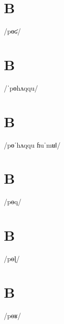 \documentclass[10pt,a4paper,twoside]{book}
\begin{document}
\section*{B}

\begin{multicols}{3}
 {/pɵʛ/} {}
\end{multicols}

\section*{B}

\begin{multicols}{3}
 {/ˈpɵhʌqqu/} {}
\end{multicols}

\section*{B}

\begin{multicols}{3}
 {/pɵˈhʌqqu ɦuˈmʉǁ/} {}
\end{multicols}

\section*{B}

\begin{multicols}{3}
 {/pɵq/} {}
\end{multicols}

\section*{B}

\begin{multicols}{3}
 {/pɵɭ/} {}
\end{multicols}

\section*{B}

\begin{multicols}{3}
 {/pɵʁ/} {}
\end{multicols}
\end{document}
